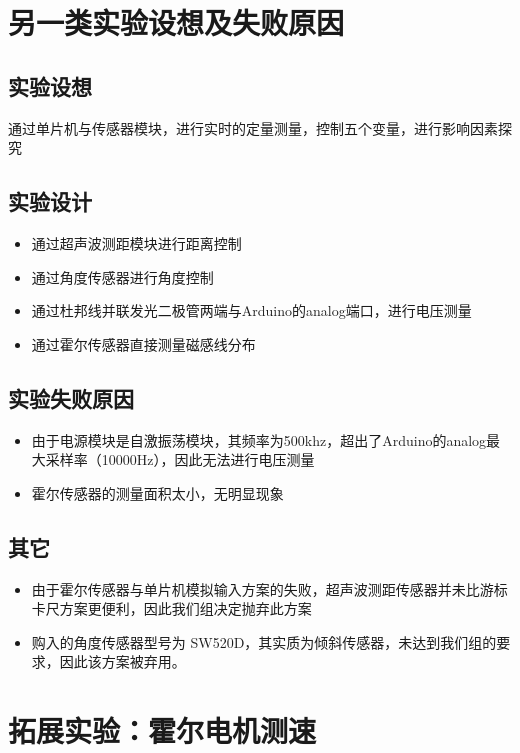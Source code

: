 \documentclass[conference]{IEEEtran}
\theoremstyle{break}
\begin{document}
\section{另一类实验设想及失败原因}
\subsection{实验设想}
通过单片机与传感器模块，进行实时的定量测量，控制五个变量，进行影响因素探究
\subsection{实验设计}
\begin{itemize}
        \item 通过超声波测距模块进行距离控制
        \item 通过角度传感器进行角度控制
        \item 通过杜邦线并联发光二极管两端与Arduino的analog端口，进行电压测量
        \item 通过霍尔传感器直接测量磁感线分布
\end{itemize}
\subsection{实验失败原因}
\begin{itemize}
        \item 由于电源模块是自激振荡模块，其频率为500khz，超出了Arduino的analog最大采样率（10000Hz），因此无法进行电压测量
        \item 霍尔传感器的测量面积太小，无明显现象
\end{itemize}
\subsection{其它}
\begin{itemize}
        \item   由于霍尔传感器与单片机模拟输入方案的失败，超声波测距传感器并未比游标卡尺方案更便利，因此我们组决定抛弃此方案
        \item   购入的角度传感器型号为 SW520D，其实质为倾斜传感器，未达到我们组的要求，因此该方案被弃用。
\end{itemize}

\section{拓展实验：霍尔电机测速}
\end{document}
